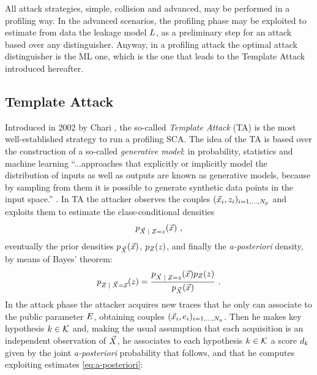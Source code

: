 All attack strategies, simple, collision and advanced, may be performed in a profiling way. In the advanced scenarios, the profiling phase may be exploited to estimate from data the leakage model $L$, as a preliminary step for an attack based over any distinguisher. Anyway, in a profiling attack the optimal attack distinguisher is the ML one, which is the one that leads to the Template Attack introduced hereafter.



\subsection{Template Attack}\label{sec:TA}
Introduced in 2002 by Chari \cite{Chari2003}, the so-called \emph{Template Attack} (TA) is the most well-established strategy to run a profiling SCA. The idea of the TA is based over the construction of a so-called \emph{generative model}: in probability, statistics and machine learning \enquote{...approaches that explicitly or implicitly model the distribution of inputs as well as outputs are known as generative models, because by sampling from them it is possible to generate synthetic data points in the input space.} \cite{christopher2006pattern}.
In TA the attacker observes the couples $(\vec{x}_i, z_i)_{i=1, \dots , N_p}$  and exploits them to estimate the class-conditional densities  
\begin{equation}\label{eq:class-conditional}
\pdf_{\given{\vaLeakVec}{\sensRandVar = \sensVar}}(\vLeakVec)\mbox{ ,}
\end{equation}
eventually the prior densities $p_{\vec{X}}(\vec{x})$, $p_{Z}(z)$, and finally the \textit{a-posteriori} density, by means of Bayes' theorem:
\begin{equation}\label{eq:a-posteriori}
\pdf_{\given{\sensRandVar}{  \vaLeakVec = \vLeakVec}}(\sensVar) = \frac{\pdf_{\given{\vaLeakVec}{\sensRandVar = \sensVar}}(\vLeakVec)\pdf_{\sensRandVar}(\sensVar)} {\pdf_{\vaLeakVec}(\vLeakVec)}\mbox{ .}
\end{equation}
In the attack phase the attacker acquires new traces that he only can associate to the public parameter $E$, obtaining couples  $(\vec{x}_i, e_i)_{i=1, \dots , N_a}$. Then he makes key hypothesis $k \in \mathcal{K}$ and, making the usual assumption that each acquisition is an independent observation of $\vec{X}$, he associates to each hypothesis $k \in \mathcal{K}$ a score $d_k$ given by the joint \textit{a-posteriori} probability that follows, and that he computes exploiting estimates \eqref{eq:a-posteriori}:


